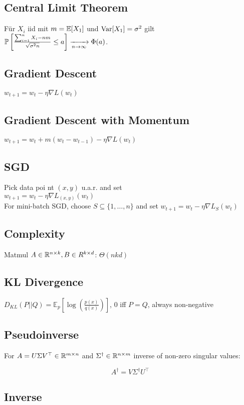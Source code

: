 \subsection*{Central Limit Theorem}

Für $X_i$ iid mit $m = \E[X_1]$ und $\Var[X_1] = \sigma^2$ gilt $\P\left[\frac{\sum_{i=1}^n X_i - n m}{\sqrt{\sigma^2 n}} \leq a\right] \xrightarrow[n \to \infty]{} \Phi(a)$.

\subsection*{Gradient Descent}
$w_{t+1} = w_t - \eta \nabla L(w_t)$
\subsection*{Gradient Descent with Momentum} $w_{t+1}=w_t+m(w_t-w_{t-1})-\eta \nabla L(w_t)$
\subsection*{SGD}
Pick data poi nt $(x,y)$ u.a.r. and set\\  $w_{t+1} = w_t - \eta \nabla L_{(x,y)}(w_t)$ \\ For mini-batch SGD, choose $S \subseteq \{1, \ldots, n\}$ and set $w_{t+1} = w_t - \eta \nabla L_{S}(w_t)$
\subsection*{Complexity}
Matmul $A\in\R^{n\times k},B\in R^{k\times d}$: $\Theta(n k d)$

\subsection*{KL Divergence}
$D_{KL}(P||Q) = \mathbb{E}_p[\log(\frac{p(x)}{q(x)})]$, 0 iff $P = Q$, always non-negative
\\

\subsection*{Pseudoinverse}

For $A = U \Sigma V^\top \in \R^{m \times n}$ and $\Sigma^\dagger \in \R^{n \times m}$ inverse of non-zero singular values:

$$
A^\dagger = V \Sigma^\dagger U^\top
$$

\subsection*{Inverse}

